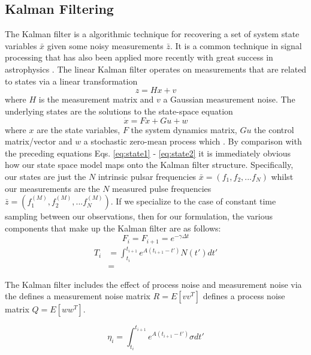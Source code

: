 \documentclass[fleqn,usenatbib,useAMS]{mnras}
\begin{document}
\subsection{Kalman Filtering}\label{sec:kalman_filter}
The Kalman filter \citep{Kalman1} is a algorithmic technique for recovering a set of system state variables $\bar{x}$ given some noisy measurements $\bar{z}$. It is a common technique in signal processing that has also been applied more recently with great success in astrophysics \citep[e.g.][]{Meyers2021,Melatos2023}. The linear Kalman filter operates on measurements that are related to states via a linear transformation
\begin{equation}
	z = Hx + v
\end{equation}
where $H$ is the measurement matrix and $v$ a Gaussian measurement noise. The underlying states are the solutions to the state-space equation 
\begin{equation}
	\dot{x} = Fx + Gu + w
\end{equation}
where $x$ are the state variables, $F$ the system dynamics matrix, $G u$ the control matrix/vector and $w$ a stochastic zero-mean process which .  By comparison with the preceding equations Eqs. 	\ref{eq:state1} - 	\ref{eq:state2} it is immediately obvious how our state space model maps onto the Kalman filter structure. Specifically, our states are just the $N$ intrinsic pulsar frequencies $\bar{x} = (f_1,f_2,...f_N)$ whilst our measurements are the $N$ measured pulse frequencies $\bar{z} = (f^{(M)}_1,f^{(M)}_2,...f^{(M)}_N)$. If we specialize to the case of constant time sampling between our observations, then for our formulation, the various components that make up the Kalman filter are as follows: 
\begin{equation}
	F_i = F_{i+1} = e^{-\gamma \Delta t}
\end{equation}
\begin{align}
	T_i &= \int_{t_i}^{t_{i+1}}  e^{A (t_{i+1} - t')} N(t') dt' \\
	    & =
\end{align}






The Kalman filter includes the effect of process noise and measurement noise via the defines a measurement noise matrix $R = E[v v^T]$
defines a process noise matrix $Q = E[w w^T]$.

\begin{equation}
	\eta_i = \int_{t_i}^{t_{i+1}}  e^{A (t_{i+1} - t')} \sigma dt'
\end{equation}
\end{document}
